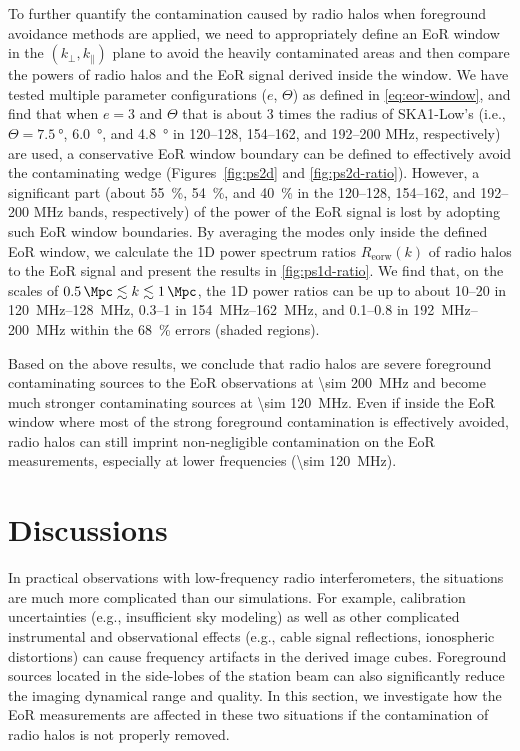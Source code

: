 \documentclass[twocolumn]{aastex62}
\newcommand{\R}[1]{\mathrm{#1}}
\newcommand{\klos}{\text{$k_{\parallel}$}}
\newcommand{\kperp}{\text{$k_{\bot}$}}
\newcommand{\fov}{\text{Fo\!V}}
\begin{document}
To further quantify the contamination caused by radio halos when
foreground avoidance methods are applied, we need to appropriately
define an EoR window in the $(\kperp, \klos)$ plane to avoid the
heavily contaminated areas and then compare the powers of radio halos
and the EoR signal derived inside the window.
We have tested multiple parameter configurations ($e$, $\Theta$) as
defined in \autoref{eq:eor-window}, and find that when $e = 3$ and
$\Theta$ that is about 3 times the radius of SKA1-Low's \fov{} (i.e.,
$\Theta = \SI{7.5}{\degree}$, \SI{6.0}{\degree}, and \SI{4.8}{\degree}
in \numrange{120}{128}, \numrange{154}{162}, and \numrange{192}{200}
\si{\MHz}, respectively) are used, a conservative EoR window boundary
can be defined to effectively avoid the contaminating wedge
(Figures~\ref{fig:ps2d} and \ref{fig:ps2d-ratio}).
However, a significant part (about \SI{55}{\percent}, \SI{54}{\percent},
and \SI{40}{\percent} in the \numrange{120}{128}, \numrange{154}{162},
and \numrange{192}{200} \si{\MHz} bands, respectively) of the power of
the EoR signal is lost by adopting such EoR window boundaries.
By averaging the modes only inside the defined EoR window, we calculate
the 1D power spectrum ratios $R_{\R{eorw}}(k)$ of radio halos to the EoR
signal and present the results in \autoref{fig:ps1d-ratio}.
We find that, on the scales of
$\SI{0.5}{\per\Mpc} \lesssim k \lesssim \SI{1}{\per\Mpc}$,
the 1D power ratios can be up to about
\numrange{10}{20} in \SIrange{120}{128}{\MHz},
\numrange{0.3}{1} in \SIrange{154}{162}{\MHz}, and
\numrange{0.1}{0.8} in \SIrange{192}{200}{\MHz}
within the \SI{68}{\percent} errors (shaded regions).

Based on the above results, we conclude that radio halos are severe
foreground contaminating sources to the EoR observations at
\SI{\sim 200}{\MHz} and become much stronger contaminating sources at
\SI{\sim 120}{\MHz}.
Even if inside the EoR window where most of the strong foreground
contamination is effectively avoided, radio halos can still imprint
non-negligible contamination on the EoR measurements, especially at
lower frequencies (\SI{\sim 120}{\MHz}).


\section{Discussions}
\label{sec:discussions}

In practical observations with low-frequency radio interferometers, the
situations are much more complicated than our simulations.
For example, calibration uncertainties (e.g., insufficient sky modeling)
as well as other complicated instrumental and observational effects
(e.g., cable signal reflections, ionospheric distortions) can cause
frequency artifacts in the derived image cubes.
Foreground sources located in the side-lobes of the station beam can
also significantly reduce the imaging dynamical range and quality.
In this section, we investigate how the EoR measurements are affected
in these two situations if the contamination of radio halos is not
properly removed.
\end{document}
